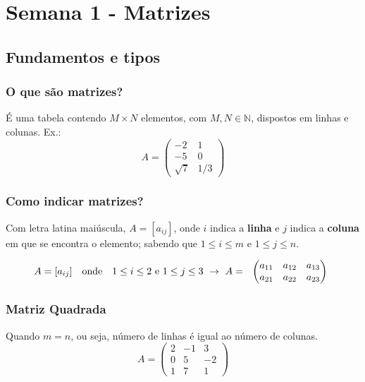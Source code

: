 \documentclass[12pt]{article}
\begin{document}
\pagebreak

\section{Semana 1 - Matrizes}
\subsection{Fundamentos e tipos}

\subsubsection{O que são matrizes?}
É uma tabela contendo $M \times N$ elementos, com $M,N \in \mathbb{N}$, dispostos em linhas e colunas.
Ex.: \[
A = 
    \begin{pmatrix}
        -2       & 1    \\
        -5       & 0    \\
        \sqrt{7} & 1/3
    \end{pmatrix}
\]

\subsubsection{Como indicar matrizes?}
Com letra latina maiúscula, $A=[a_{ij}]$, onde $i$ indica a \textbf{linha} e $j$ indica a \textbf{coluna} em que se encontra o elemento;
sabendo que $1 \leq i \leq m$ e $1 \leq j \leq n$.

\noindent
\[
A = [a_{ij}] \quad \text{onde} \quad 1 \leq i \leq 2 \text{ e } 1 \leq j \leq 3 \ \rightarrow \ A =
\begin{array}{c}
    \hphantom{}
        \begin{pmatrix}
            a_{11} & a_{12} & a_{13} \\
            a_{21} & a_{22} & a_{23}
        \end{pmatrix}
\end{array}
\]

\subsubsection{Matriz Quadrada}
Quando $m=n$, ou seja, número de linhas é igual ao número de colunas.
\noindent
\[
A = 
    \begin{pmatrix}
        2  & -1  &  3 \\
        0  &  5  & -2 \\
        1  &  7  &  1
    \end{pmatrix}
\]
\end{document}
